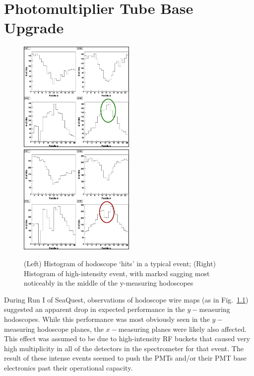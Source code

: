 \chapter{Photomultiplier Tube Base Upgrade}

\begin{figure}
	\centerline{
		\mbox{\includegraphics[width=0.5\textwidth]{figures/pmtupgrade/nosag.jpg} \includegraphics[width=0.5\textwidth]{figures/pmtupgrade/sag.jpg}}
	}
	\caption{(Left) Histogram of hodoscope `hits' in a typical event; (Right) Histogram of high-intensity event, with marked sagging most noticeably in the middle of the y-measuring hodoscopes}
	\label{fig:sag}
\end{figure}

During Run I of SeaQuest, observations of hodoscope wire maps (as in Fig.~\ref{fig:sag}) suggested an apparent drop in expected performance in the $y-$measuring hodoscopes. While this performance was most obviously seen in the $y-$measuring hodoscope planes, the $x-$measuring planes were likely also affected. This effect was assumed to be due to high-intensity RF buckets that caused very high multiplicity in all of the detectors in the spectrometer for that event. The result of these intense events seemed to push the PMTs and/or their PMT base electronics past their operational capacity.

